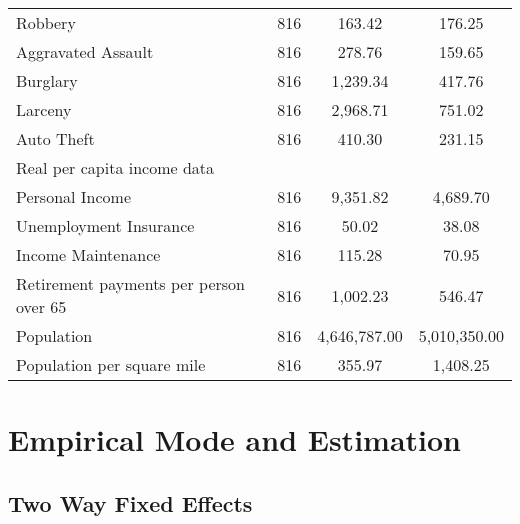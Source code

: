 \documentclass{article}
\begin{document}
\begin{table}[h]
\begin{tabular}[t]{@{\extracolsep{5pt}}lccc}
\hspace{3mm}Robbery& 816 & 163.42 & 176.25 \\ 
\hspace{3mm}Aggravated Assault & 816 & 278.76 & 159.65 \\ 
\hspace{3mm}Burglary & 816 & 1,239.34 & 417.76 \\ 
\hspace{3mm}Larceny & 816 & 2,968.71 & 751.02 \\ 
\hspace{3mm}Auto Theft & 816 & 410.30 & 231.15 \\ 
Real per capita income data &&&\\
\hspace{3mm}Personal Income & 816 & 9,351.82 & 4,689.70 \\ 
\hspace{3mm}Unemployment Insurance & 816 & 50.02 & 38.08 \\ 
\hspace{3mm}Income Maintenance & 816 & 115.28 & 70.95 \\ 
\hspace{3mm}Retirement payments per person over 65 & 816 & 1,002.23 & 546.47 \\ 
Population & 816 & 4,646,787.00 & 5,010,350.00 \\ 
Population per square mile & 816 & 355.97 & 1,408.25 \\ 
\bottomrule
\end{tabular} 
\end{table} 
\section*{Empirical Mode and Estimation}
\subsection*{Two Way Fixed Effects}
\end{document}
